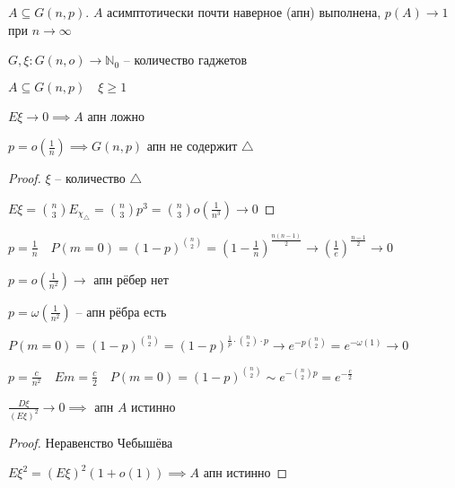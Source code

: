 \documentclass{book}
\newcommand\N{\ensuremath{\mathbb{N}}}
\theoremstyle{definition}
\begin{document}
 \begin{theorem}
     $A \subseteq G(n, p)$. $A$ асимптотически почти наверное (апн) выполнена, $p(A) \to 1$ при $n\to \infty $
\end{theorem}

$G, \xi: G(n, o) \to \N_0 $ -- количество гаджетов

$A \subseteq G(n, p)\quad \xi \geqslant 1$

\begin{lemma}
    $E\xi \to 0 \implies A$ апн ложно
\end{lemma}


\begin{statement}
    $p = o\left(\frac{1}{n}  \right) \implies G(n, p)$ апн не содержит $\triangle$
\end{statement}
\begin{proof}
    $\xi$ -- количество  $\triangle$

    $E\xi = {n\choose 3} E_{\chi_{\triangle}} = {n\choose 3} p^3 = {n\choose 3} o\left( \frac{1}{n^3} \right) \to 0$
\end{proof}

$p = \frac{1}{n}\quad P(m=0) = (1-p)^{n\choose 2} = \left( 1 - \frac{1}{n} \right) ^{\frac{n(n-1)}{2}} \to  \left( \frac{1}{e} \right) ^{\frac{n-1}{2}} \to 0$

$p = o\left( \frac{1}{n^2} \right) \to $ апн рёбер нет

$p = \omega\left( \frac{1}{n^2} \right) $ -- апн рёбра есть

$P(m=0) = \left( 1-p \right) ^{n\choose 2} = \left( 1-p \right) ^{\frac{1}{p}\cdot {n\choose 2}\cdot p} \to e^{-p {n\choose 2}} = e^{-\omega(1)} \to 0$

$p = \frac{c}{n^2}\quad Em = \frac{c}{2}\quad P(m=0) = (1-p)^{n\choose 2}\sim e^{- {n\choose 2}p} = e^{-\frac{c}{2}}$

\begin{lemma}

    $\frac{D\xi}{\left( E\xi \right) ^2}\to 0\implies $ апн $A$ истинно
\end{lemma}
\begin{proof}
    Неравенство Чебышёва

    $E\xi^2 = \left( E\xi \right) ^2\left( 1 + o(1) \right)  \implies A$ апн истинно
\end{proof}
\end{document}
